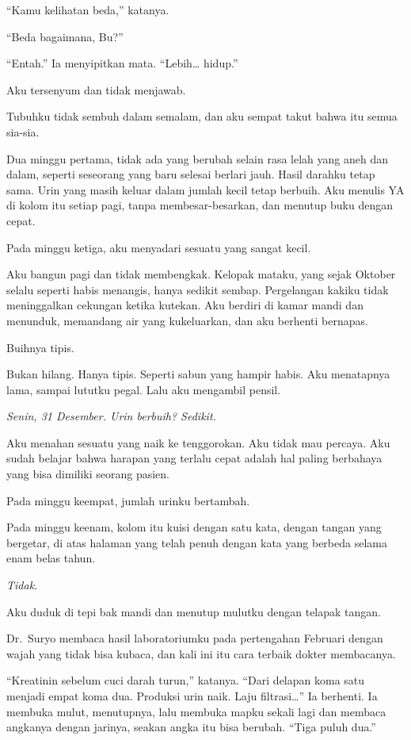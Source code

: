 \documentclass[11pt,twoside,openany]{book}
\makeatletter
\newcommand{\scenebreak}{\par\vspace{0.9em}{\centering\textsc{*\hspace{0.7em}*\hspace{0.7em}*}\par}\vspace{0.9em}\@afterindentfalse\@afterheading}
\makeatother
\begin{document}
``Kamu kelihatan beda,'' katanya.

``Beda bagaimana, Bu?''

``Entah.'' Ia menyipitkan mata. ``Lebih\ldots{} hidup.''

Aku tersenyum dan tidak menjawab.

\scenebreak
Tubuhku tidak sembuh dalam semalam, dan aku sempat takut bahwa itu semua sia-sia.

Dua minggu pertama, tidak ada yang berubah selain rasa lelah yang aneh dan dalam, seperti seseorang yang baru selesai berlari jauh. Hasil darahku tetap sama. Urin yang masih keluar dalam jumlah kecil tetap berbuih. Aku menulis YA di kolom itu setiap pagi, tanpa membesar-besarkan, dan menutup buku dengan cepat.

Pada minggu ketiga, aku menyadari sesuatu yang sangat kecil.

Aku bangun pagi dan tidak membengkak. Kelopak mataku, yang sejak Oktober selalu seperti habis menangis, hanya sedikit sembap. Pergelangan kakiku tidak meninggalkan cekungan ketika kutekan. Aku berdiri di kamar mandi dan menunduk, memandang air yang kukeluarkan, dan aku berhenti bernapas.

Buihnya tipis.

Bukan hilang. Hanya tipis. Seperti sabun yang hampir habis. Aku menatapnya lama, sampai lututku pegal. Lalu aku mengambil pensil.

\emph{Senin, 31 Desember. Urin berbuih? Sedikit.}

Aku menahan sesuatu yang naik ke tenggorokan. Aku tidak mau percaya. Aku sudah belajar bahwa harapan yang terlalu cepat adalah hal paling berbahaya yang bisa dimiliki seorang pasien.

Pada minggu keempat, jumlah urinku bertambah.

Pada minggu keenam, kolom itu kuisi dengan satu kata, dengan tangan yang bergetar, di atas halaman yang telah penuh dengan kata yang berbeda selama enam belas tahun.

\emph{Tidak.}

Aku duduk di tepi bak mandi dan menutup mulutku dengan telapak tangan.

\scenebreak
Dr.~Suryo membaca hasil laboratoriumku pada pertengahan Februari dengan wajah yang tidak bisa kubaca, dan kali ini itu cara terbaik dokter membacanya.

``Kreatinin sebelum cuci darah turun,'' katanya. ``Dari delapan koma satu menjadi empat koma dua. Produksi urin naik. Laju filtrasi\ldots{}'' Ia berhenti. Ia membuka mulut, menutupnya, lalu membuka mapku sekali lagi dan membaca angkanya dengan jarinya, seakan angka itu bisa berubah. ``Tiga puluh dua.''
\end{document}
